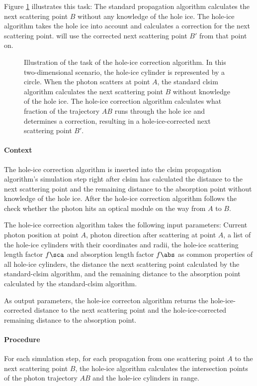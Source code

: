 Figure \ref{fig:Edahi9sh} illustrates this task: The standard  propagation algorithm calculates the next scattering point $B$ without any knowledge of the hole ice. The hole-ice algorithm takes the hole ice into account and calculates a correction for the next scattering point.  will use the corrected next scattering point $B'$ from that point on.

\begin{figure}[htbp]
  \caption{Illustration of the task of the hole-ice correction algorithm. In this two-dimensional scenario, the hole-ice cylinder is represented by a circle. When the photon scatters at point $A$, the standard clsim algorithm calculates the next scattering point $B$ without knowledge of the hole ice. The hole-ice correction algorithm calculates what fraction of the trajectory $AB$ runs through the hole ice and determines a correction, resulting in a hole-ice-corrected next scattering point $B'$.}
  \label{fig:Edahi9sh}
\end{figure}

\paragraph{Context} The hole-ice correction algorithm is inserted into the clsim propagation algorithm's simulation step right after clsim has calculated the distance to the next scattering point and the remaining distance to the absorption point without knowledge of the hole ice. After the hole-ice correction algorithm follows the check whether the photon hits an optical module on the way from $A$ to $B$.

The hole-ice correction algorithm takes the following input parameters: Current photon position at point $A$, photon direction after scattering at point $A$, a list of the hole-ice cylinders with their coordinates and radii, the hole-ice scattering length factor $f\sca$ and absorption length factor $f\abs$ as common properties of all hole-ice cylinders, the distance the next scattering point calculated by the standard-clsim algorithm, and the remaining distance to the absorption point calculated by the standard-clsim algorithm.

As output parameters, the hole-ice correcton algorithm returns the hole-ice-corrected distance to the next scattering point and the hole-ice-corrected remaining distance to the absorption point.

\paragraph{Procedure} For each simulation step, for each propagation from one scattering point $A$ to the next scattering point $B$, the hole-ice algorithm calculates the intersection points of the photon trajectory $AB$ and the hole-ice cylinders in range.

